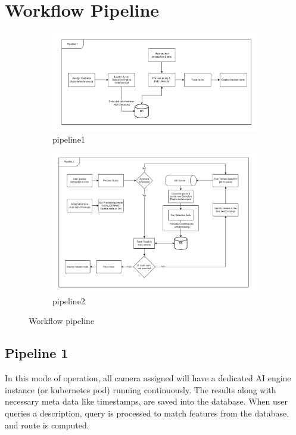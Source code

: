 \section{Workflow Pipeline}

\begin{figure}[ht!]
	\centering
	\begin{subfigure}[b]{0.8\linewidth}
		\centering
		\includegraphics[width=\linewidth]{Images/pipeline1}
		\caption{pipeline1}
		\label{fig:pipeline1}
	\end{subfigure}
	
	\begin{subfigure}[b]{0.8\linewidth}
		\centering
		\includegraphics[width=\linewidth]{Images/pipeline2}
		\caption{pipeline2}
		\label{fig:pipeline2}
	\end{subfigure}
	\caption{Workflow pipeline}
\end{figure}

\subsection*{Pipeline 1}
In this mode of operation, all camera assigned will have a dedicated AI engine instance (or kubernetes pod) running continuously. The results along with necessary meta data like timestamps, are saved into the database. When user queries a description, query is processed to match features from the database, and route is computed. 

